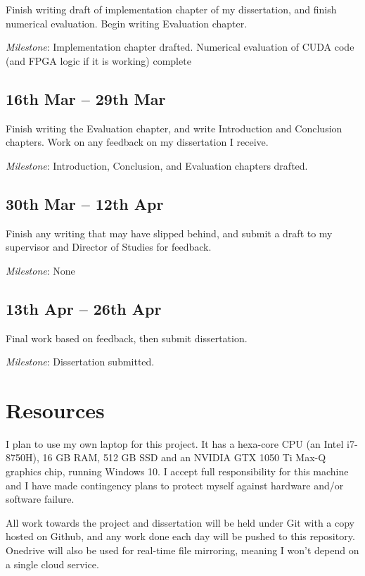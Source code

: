 Finish writing draft of implementation chapter of my dissertation, and finish numerical evaluation. Begin writing Evaluation chapter.

\textit{Milestone}: Implementation chapter drafted. Numerical evaluation of CUDA code (and FPGA logic if it is working) complete

\subsection*{16th Mar -- 29th Mar}

Finish writing the Evaluation chapter, and write Introduction and Conclusion chapters.
Work on any feedback on my dissertation I receive.

\textit{Milestone}: Introduction, Conclusion, and Evaluation chapters drafted.

\subsection*{30th Mar -- 12th Apr}

Finish any writing that may have slipped behind, and submit a draft to my supervisor and Director of Studies for feedback.

\textit{Milestone}: None

\subsection*{13th Apr -- 26th Apr}

Final work based on feedback, then submit dissertation.

\textit{Milestone}: Dissertation submitted.

\section*{Resources}

I plan to use my own laptop for this project. It has a hexa-core CPU (an Intel i7-8750H), 16 GB RAM, 512 GB SSD and an NVIDIA GTX 1050 Ti Max-Q graphics chip, running Windows 10.
I accept full responsibility for this machine and I have made contingency plans
to protect myself against hardware and/or software failure.

All work towards the project and dissertation will be held under Git with a copy hosted on Github, and any work done each day will be pushed to this repository.
Onedrive will also be used for real-time file mirroring, meaning I won't depend
on a single cloud service.

